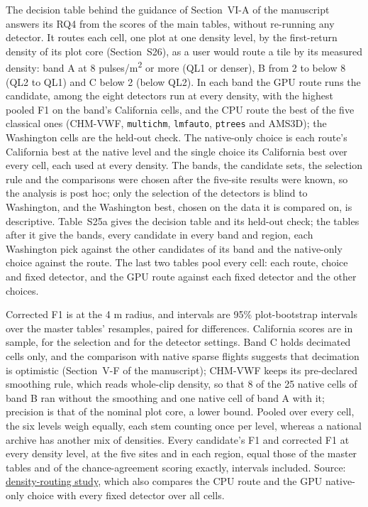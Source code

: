 \documentclass[10pt]{article}
\makeatletter
\newcommand\suppFloatBarrier{\par\addpenalty\z@
  \ifx\@deferlist\@empty\else\expandafter\supp@flush\fi}
\newcommand\supp@flush{\let\supp@waiting\@deferlist
  \newpage
  \ifx\@deferlist\supp@waiting\null\newpage\fi
  \ifx\@deferlist\supp@waiting\expandafter\clearpage\else\expandafter\suppFloatBarrier\fi}
\gdef\supp@afterheading{}
\renewcommand\section{\suppFloatBarrier
    \gdef\supp@afterheading{\suppressfloats[t]\gdef\supp@afterheading{}}\supp@section}}
\makeatother
\begin{document}
\section*{S25. Density Routing by Band and Region}

The decision table behind the guidance of Section~VI-A of the manuscript answers
its RQ4 from the scores of the main tables, without re-running any detector. It
routes each cell, one plot at one density level, by the first-return density of
its plot core (Section~S26), as a user would route a tile by its measured
density: band A at 8 pulses/m\textsuperscript{2} or more (QL1 or denser), B from 2 to below 8 (QL2
to QL1) and C below 2 (below QL2). In each band the GPU route runs the
candidate, among the eight detectors run at every density, with the highest
pooled F1 on the band's California cells, and the CPU route the best of the five
classical ones (CHM-VWF, \texttt{multichm}, \texttt{lmfauto}, \texttt{ptrees} and AMS3D); the
Washington cells are the held-out check. The native-only choice is each route's
California best at the native level and the single choice its California best
over every cell, each used at every density. The bands, the candidate sets, the
selection rule and the comparisons were chosen after the five-site results were
known, so the analysis is post hoc; only the selection of the detectors is blind
to Washington, and the Washington best, chosen on the data it is compared on, is
descriptive. Table~S25a gives the decision table and its held-out check; the
tables after it give the bands, every candidate in every band and region, each
Washington pick against the other candidates of its band and the native-only
choice against the route. The last two tables pool every cell: each route,
choice and fixed detector, and the GPU route against each fixed detector and the
other choices.

Corrected F1 is at the 4 m radius, and intervals are 95\% plot-bootstrap
intervals over the master tables' resamples, paired for differences. California
scores are in sample, for the selection and for the detector settings. Band C
holds decimated cells only, and the comparison with native sparse flights
suggests that decimation is optimistic (Section~V-F of the manuscript); CHM-VWF
keeps its pre-declared smoothing rule, which reads whole-clip density, so that 8
of the 25 native cells of band B ran without the smoothing and one native cell
of band A with it; precision is that of the nominal plot core, a lower bound.
Pooled over every cell, the six levels weigh equally, each stem counting once
per level, whereas a national archive has another mix of densities. Every
candidate's F1 and corrected F1 at every density level, at the five sites and in
each region, equal those of the master tables and of the chance-agreement
scoring exactly, intervals included. Source: \href{https://github.com/devakellc/lidar-tree-benchmark/blob/main/results/density-routing-results.md}{density-routing
study}, which also compares the CPU route
and the GPU native-only choice with every fixed detector over all cells.
\end{document}
